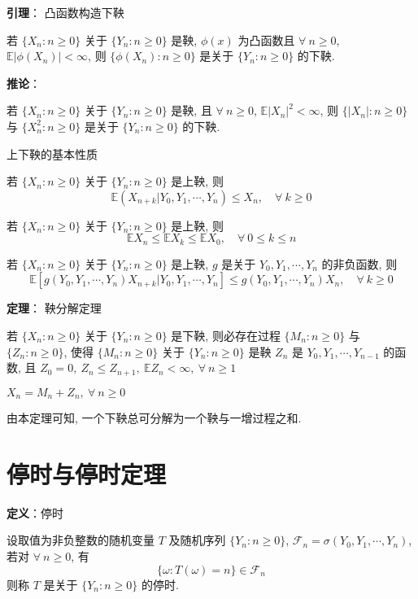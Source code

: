 \documentclass[openany]{ctexbook}
\theoremstyle{kaiti}
\theoremstyle{normal}
\begin{document}
\textbf{引理}： 凸函数构造下鞅

若 $\{X_n:n\geqslant0\}$ 关于 $\{Y_n:n\geqslant0\}$ 是鞅, $\phi(x)$ 为凸函数且 $\forall~n\geqslant0$, $\mathbb{E}|\phi(X_n)|<\infty$, 则 $\{\phi(X_n):n\geqslant0\}$ 是关于 $\{Y_n:n\geqslant0\}$ 的下鞅.

\textbf{推论}：

若 $\{X_n:n\geqslant0\}$ 关于 $\{Y_n:n\geqslant0\}$ 是鞅, 且 $\forall~n\geqslant0$, $\mathbb{E}|X_n|^2<\infty$, 则 $\{|X_n|:n\geqslant0\}$ 与 $\{X_n^2:n\geqslant0\}$ 是关于 $\{Y_n:n\geqslant0\}$ 的下鞅.

上下鞅的基本性质

若 $\{X_n:n\geqslant0\}$ 关于 $\{Y_n:n\geqslant0\}$ 是上鞅, 则
\begin{equation}
  \mathbb{E}(X_{n+k}|Y_0,Y_1,\cdots,Y_n)\leqslant X_n,\quad\forall~k\geqslant0
\end{equation}

若 $\{X_n:n\geqslant0\}$ 关于 $\{Y_n:n\geqslant0\}$ 是上鞅, 则
\begin{equation}
  \mathbb{E}X_n\leqslant \mathbb{E}X_k\leqslant \mathbb{E}X_0,\quad\forall~0\leqslant k\leqslant n
\end{equation}

若 $\{X_n:n\geqslant0\}$ 关于 $\{Y_n:n\geqslant0\}$ 是上鞅, $g$ 是关于 $Y_0,Y_1,\cdots,Y_n$ 的非负函数, 则
\begin{equation}
  \mathbb{E}[g(Y_0,Y_1,\cdots,Y_n)X_{n+k}|Y_0,Y_1,\cdots,Y_n]\leqslant g(Y_0,Y_1,\cdots,Y_n)X_n,\quad\forall~k\geqslant0
\end{equation}

\textbf{定理}： 鞅分解定理

若 $\{X_n:n\geqslant0\}$ 关于 $\{Y_n:n\geqslant0\}$ 是下鞅, 则必存在过程 $\{M_n:n\geqslant0\}$ 与 $\{Z_n:n\geqslant0\}$, 使得 $\{M_n:n\geqslant0\}$ 关于 $\{Y_n:n\geqslant0\}$ 是鞅 $Z_n$ 是 $Y_0,Y_1,\cdots,Y_{n-1}$ 的函数, 且 $Z_0=0,~Z_n\leqslant Z_{n+1},~\mathbb{E}Z_n<\infty,~\forall~n\geqslant1$

$X_n=M_n+Z_n,~\forall~n\geqslant0$

由本定理可知, 一个下鞅总可分解为一个鞅与一增过程之和.

\section{停时与停时定理}

\textbf{定义}：停时

设取值为非负整数的随机变量 $T$ 及随机序列 $\{Y_n:n\geqslant0\}$, $\mathcal{F}_n=\sigma(Y_0,Y_1,\cdots,Y_n)$, 若对 $\forall~n\geqslant0$, 有
\begin{equation}
  \{\omega:T(\omega)=n\}\in\mathcal{F}_n
\end{equation}
则称 $T$ 是关于 $\{Y_n:n\geqslant0\}$ 的停时.
\end{document}
